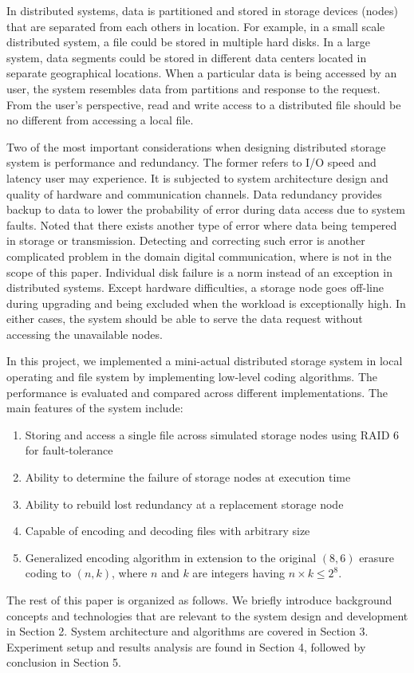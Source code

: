 In distributed systems, data is partitioned and stored in storage devices (nodes) that are separated from each others in location. For example, in a small scale distributed system, a file could be stored in multiple hard disks. In a large system, data segments could be stored in different data centers located in separate geographical locations. When a particular data is being accessed by an user, the system resembles data from partitions and response to the request. From the user's perspective, read and write access to a distributed file should be no different from accessing a local file.

Two of the most important considerations when designing distributed storage system is performance and redundancy. The former refers to I/O speed and latency user may experience. It is subjected to system architecture design and quality of hardware and communication channels. Data redundancy provides backup to data to lower the probability of error during data access due to system faults. Noted that there exists another type of error where data being tempered in storage or transmission. Detecting and correcting such error is another complicated problem in the domain digital communication, where is not in the scope of this paper.
Individual disk failure is a norm instead of an exception in distributed systems. Except hardware difficulties, a storage node goes off-line during upgrading and being excluded when the workload is exceptionally high. In either cases, the system should be able to serve the data request without accessing the unavailable nodes.

In this project, we implemented a mini-actual distributed storage system in local operating and file system by implementing low-level coding algorithms. The performance is evaluated and compared across different implementations. The main features of the system include: 

\begin{enumerate}
	\item Storing and access a single file across simulated storage nodes using RAID 6 for fault-tolerance
	
	\item Ability to determine the failure of storage nodes at execution time
	
	\item Ability to rebuild lost redundancy at a replacement storage node
	
	\item Capable of encoding and decoding files with arbitrary size
	
	\item Generalized encoding algorithm in extension to the original $(8,6)$ erasure coding to $(n,k)$, where $n$ and $k$ are integers having $n \times k \leq 2^8$. 
\end{enumerate}


The rest of this paper is organized as follows. We briefly introduce background concepts and technologies that are relevant to the system design and development in Section 2. System architecture and algorithms are covered in Section 3. Experiment setup and results analysis are found in Section 4, followed by conclusion in Section 5.
